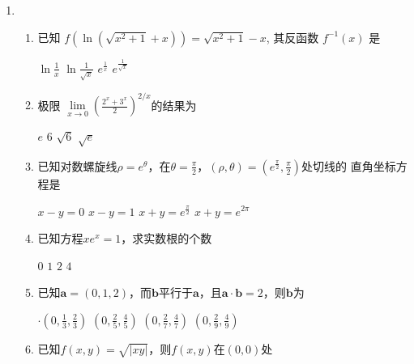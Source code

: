 
\begin{enumerate}
	\item
\begin{enumerate}
\item
已知 $f\left(\ln \left(\sqrt{x^2+1}+x\right)\right)=\sqrt{x^2+1}-x$, 其反函数 $f^{-1}(x)$ 是  

		
\fourchoices
{$\ln \frac{1}{x} $}
{$\ln \frac{1}{\sqrt{x}} $}
{$e^{\frac{1}{x}} $}
{$ e^{\frac{1}{\sqrt{x}}}$}

		
\item 
极限 $\lim\limits _{x \rightarrow 0}\left(\frac{2^x+3^x}{2}\right)^{2 / x}$的结果为  

		
\fourchoices
{$ e $}
{$ 6 $}
{$ \sqrt{6} $}
{$ \sqrt{e} $}



\item 
已知对数螺旋线$\rho=e^\theta$，在$\theta=\frac{\pi}{2} $，$ (\rho, \theta)=\left(e^{\frac{\pi}{2}}, \frac{\pi}{2}\right)$处切线的
直角坐标方程是  


\fourchoices
{$x-y=0 $}
{$ x-y=1 $}
{$x+y=e^{\frac{\pi}{2}}$}
{$x+y=e^{2 \pi}$}



\item 
已知方程$ xe^{x}=1 $，求实数根的个数  

\fourchoices
{$ 0 $}
{$ 1 $}
{$ 2 $}
{$ 4 $}


\item 
已知$ \bm{a} =(0,1,2) $，而$  \bm{b}$平行于$\bm{a} $，且$  \bm{a} \cdot \bm{b}=2$，则$  \bm{b}$为  


\fourchoices
{$ \cdot\left(0, \frac{1}{3}, \frac{2}{3}\right) $}
{$ \left(0, \frac{2}{5}, \frac{4}{5}\right) $}
{$ \left(0, \frac{2}{7}, \frac{4}{7}\right) $}
{$ \left(0, \frac{2}{9}, \frac{4}{9}\right)$}


\item 
已知$f(x, y)=\sqrt{|x y|}$，则$ f(x,y) $在$ (0,0) $处  



\end{enumerate}
\end{enumerate}
